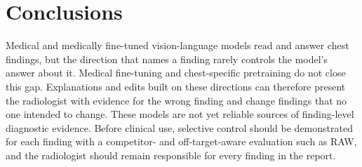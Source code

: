 \section{Conclusions}
\label{sec:conclusion}

Medical and medically fine-tuned vision-language models read and answer chest findings, but the direction that names a finding rarely controls the model's answer about it. Medical fine-tuning and chest-specific pretraining do not close this gap. Explanations and edits built on these directions can therefore present the radiologist with evidence for the wrong finding and change findings that no one intended to change. These models are not yet reliable sources of finding-level diagnostic evidence. Before clinical use, selective control should be demonstrated for each finding with a competitor- and off-target-aware evaluation such as RAW, and the radiologist should remain responsible for every finding in the report.
